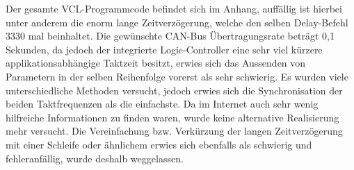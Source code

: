 Der gesamte VCL-Programmcode befindet sich im Anhang, auffällig ist hierbei unter anderem die enorm lange Zeitverzögerung, welche den selben Delay-Befehl 3330 mal beinhaltet. Die gewünschte CAN-Bus Übertragungsrate beträgt 0,1 Sekunden, da jedoch der integrierte Logic-Controller eine sehr viel kürzere applikationsabhängige Taktzeit besitzt, erwies sich das Aussenden von Parametern in der selben Reihenfolge vorerst als sehr schwierig. Es wurden viele unterschiedliche Methoden versucht, jedoch erwies sich die Synchronisation der beiden Taktfrequenzen als die einfachste. Da im Internet auch sehr wenig hilfreiche Informationen zu finden waren, wurde keine alternative Realisierung mehr versucht. Die Vereinfachung bzw. Verkürzung der langen Zeitverzögerung mit einer Schleife oder ähnlichem erwies sich ebenfalls als schwierig und fehleranfällig, wurde deshalb weggelassen.

\newpage

